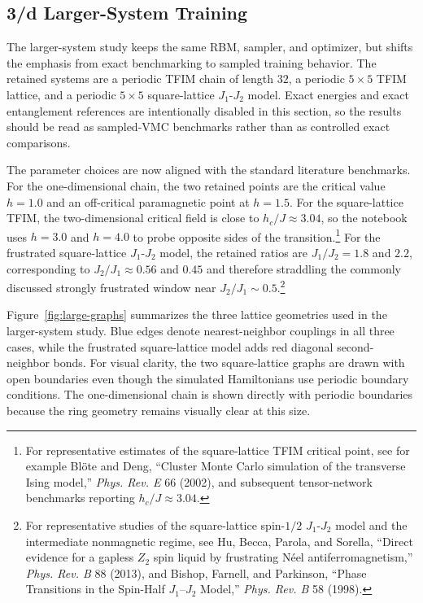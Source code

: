 \documentclass[11pt,a4paper]{article}
\begin{document}
\subsection*{3/d Larger-System Training}

The larger-system study keeps the same RBM, sampler, and optimizer, but shifts the emphasis from exact benchmarking to sampled training behavior. The retained systems are a periodic TFIM chain of length $32$, a periodic $5\times 5$ TFIM lattice, and a periodic $5\times 5$ square-lattice $J_1$-$J_2$ model. Exact energies and exact entanglement references are intentionally disabled in this section, so the results should be read as sampled-VMC benchmarks rather than as controlled exact comparisons.

The parameter choices are now aligned with the standard literature benchmarks. For the one-dimensional chain, the two retained points are the critical value $h=1.0$ and an off-critical paramagnetic point at $h=1.5$. For the square-lattice TFIM, the two-dimensional critical field is close to $h_c/J \approx 3.04$, so the notebook uses $h=3.0$ and $h=4.0$ to probe opposite sides of the transition.\footnote{For representative estimates of the square-lattice TFIM critical point, see for example Bl\"ote and Deng, ``Cluster Monte Carlo simulation of the transverse Ising model,'' \emph{Phys. Rev. E} 66 (2002), and subsequent tensor-network benchmarks reporting $h_c/J \approx 3.04$.} For the frustrated square-lattice $J_1$-$J_2$ model, the retained ratios are $J_1/J_2=1.8$ and $2.2$, corresponding to $J_2/J_1 \approx 0.56$ and $0.45$ and therefore straddling the commonly discussed strongly frustrated window near $J_2/J_1 \sim 0.5$.\footnote{For representative studies of the square-lattice spin-$1/2$ $J_1$-$J_2$ model and the intermediate nonmagnetic regime, see Hu, Becca, Parola, and Sorella, ``Direct evidence for a gapless $Z_2$ spin liquid by frustrating N\'eel antiferromagnetism,'' \emph{Phys. Rev. B} 88 (2013), and Bishop, Farnell, and Parkinson, ``Phase Transitions in the Spin-Half $J_1$--$J_2$ Model,'' \emph{Phys. Rev. B} 58 (1998).}

Figure~\ref{fig:large-graphs} summarizes the three lattice geometries used in the larger-system study. Blue edges denote nearest-neighbor couplings in all three cases, while the frustrated square-lattice model adds red diagonal second-neighbor bonds. For visual clarity, the two square-lattice graphs are drawn with open boundaries even though the simulated Hamiltonians use periodic boundary conditions. The one-dimensional chain is shown directly with periodic boundaries because the ring geometry remains visually clear at this size.
\end{document}
